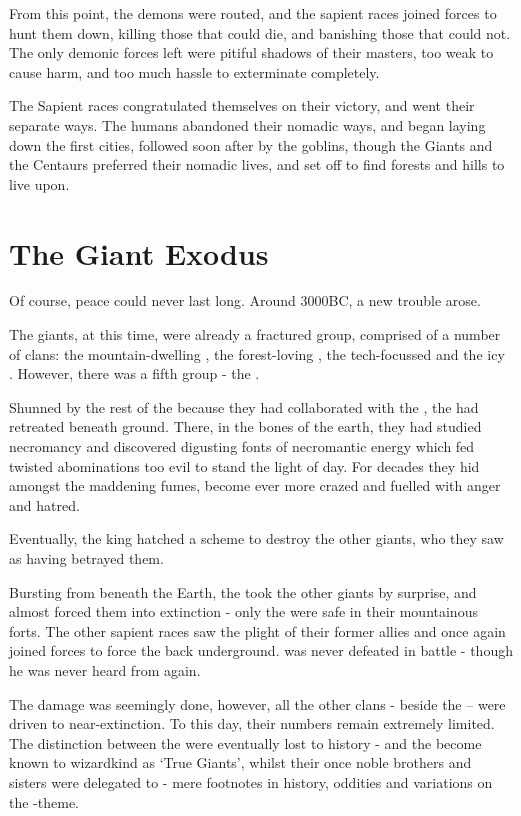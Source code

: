 \documentclass[oneside, 9pt,english]{extbook}
\begin{document}
	From this point, the demons were routed, and the sapient races joined forces to hunt them down, killing those that could die, and banishing those that could not. The only demonic forces left were pitiful shadows of their masters, too weak to cause harm, and too much hassle to exterminate completely. 
	
	The Sapient races congratulated themselves on their victory, and went their separate ways. The humans abandoned their nomadic ways, and began laying down the first cities, followed soon after by the goblins, though the Giants and the Centaurs preferred their nomadic lives, and set off to find forests and hills to live upon. 
	
	
	\section{The Giant Exodus}
	
	Of course, peace could never last long. Around 3000BC, a new trouble arose. 
	
	The giants, at this time, were already a fractured group, comprised of a number of clans: the mountain-dwelling , the forest-loving , the tech-focussed  and the icy . However, there was a fifth group - the . 
	
	Shunned by the rest of the  because they had collaborated with the , the  had retreated beneath ground. There, in the bones of the earth, they had studied necromancy and discovered digusting fonts of necromantic energy which fed twisted abominations too evil to stand the light of day. For decades they hid amongst the maddening fumes, become ever more crazed and fuelled with anger and hatred. 
	
	Eventually, the king  hatched a scheme to destroy the other giants, who they saw as having betrayed them. 
	
	Bursting from beneath the Earth, the  took the other giants by surprise, and almost forced them into extinction - only the  were safe in their mountainous forts. The other sapient races saw the plight of their former allies and once again joined forces to force the  back underground.  was never defeated in battle - though he was never heard from again. 
	
	The damage was seemingly done, however, all the other clans - beside the  -- were driven to near-extinction. To this day, their numbers remain extremely limited. The distinction between the  were eventually lost to history - and the  become known to wizardkind as `True Giants', whilst their once noble brothers and sisters were delegated to  - mere footnotes in history, oddities and variations on the -theme. 
	
\end{document}
